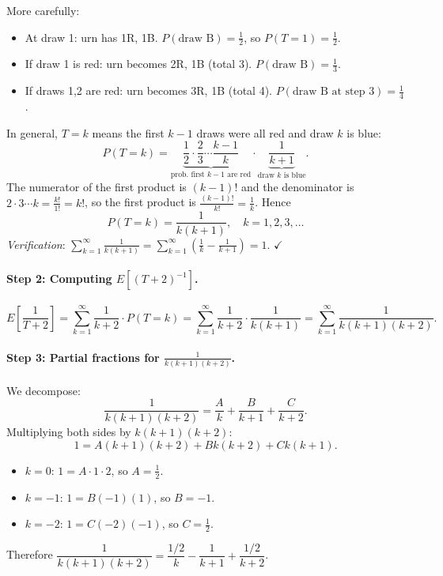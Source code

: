 \documentclass[11pt]{article}
\newcommand{\1}{\mathbf{1}}
\theoremstyle{plain}
\begin{document}
More carefully:
\begin{itemize}
  \item At draw 1: urn has 1R, 1B. $P(\text{draw B})=\frac{1}{2}$, so $P(T=1)=\frac{1}{2}$.
  \item If draw 1 is red: urn becomes 2R, 1B (total 3). $P(\text{draw B})=\frac{1}{3}$.
  \item If draws 1,2 are red: urn becomes 3R, 1B (total 4). $P(\text{draw B at step 3})=\frac{1}{4}$.
\end{itemize}
In general, $T=k$ means the first $k-1$ draws were all red and draw $k$ is blue:
\[
  P(T=k)
  = \underbrace{\frac{1}{2}\cdot\frac{2}{3}\cdots\frac{k-1}{k}}_{\text{prob.\ first }k-1\text{ are red}}
    \cdot\underbrace{\frac{1}{k+1}}_{\text{draw }k\text{ is blue}}.
\]
The numerator of the first product is $(k-1)!$ and the denominator is
$2\cdot3\cdots k=\frac{k!}{1!}=k!$, so the first product is $\frac{(k-1)!}{k!}=\frac{1}{k}$.
Hence
\[
  \boxed{P(T=k) = \frac{1}{k(k+1)}}, \quad k=1,2,3,\ldots
\]
\emph{Verification}: $\sum_{k=1}^{\infty}\frac{1}{k(k+1)}
=\sum_{k=1}^{\infty}\!\left(\frac{1}{k}-\frac{1}{k+1}\right)=1$. $\checkmark$

\paragraph{Step 2: Computing $E[(T+2)^{-1}]$.}
\[
  E\!\left[\frac{1}{T+2}\right]
  = \sum_{k=1}^{\infty}\frac{1}{k+2}\cdot P(T=k)
  = \sum_{k=1}^{\infty}\frac{1}{k+2}\cdot\frac{1}{k(k+1)}
  = \sum_{k=1}^{\infty}\frac{1}{k(k+1)(k+2)}.
\]

\paragraph{Step 3: Partial fractions for $\frac{1}{k(k+1)(k+2)}$.}
We decompose:
\[
  \frac{1}{k(k+1)(k+2)} = \frac{A}{k}+\frac{B}{k+1}+\frac{C}{k+2}.
\]
Multiplying both sides by $k(k+1)(k+2)$:
\[
  1 = A(k+1)(k+2)+Bk(k+2)+Ck(k+1).
\]
\begin{itemize}
  \item $k=0$: $1=A\cdot1\cdot2$, so $A=\frac{1}{2}$.
  \item $k=-1$: $1=B(-1)(1)$, so $B=-1$.
  \item $k=-2$: $1=C(-2)(-1)$, so $C=\frac{1}{2}$.
\end{itemize}
Therefore $\dfrac{1}{k(k+1)(k+2)}=\dfrac{1/2}{k}-\dfrac{1}{k+1}+\dfrac{1/2}{k+2}$.
\end{document}
